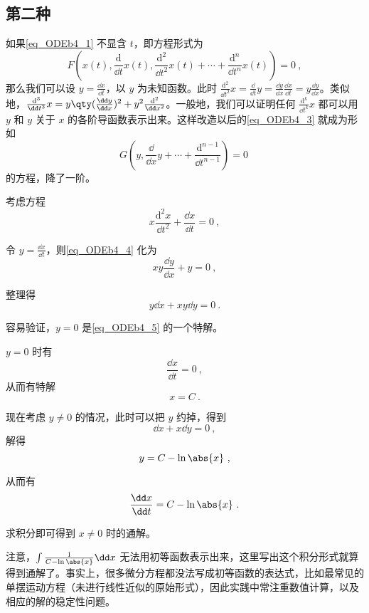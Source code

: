 \subsection{第二种}

如果\autoref{eq_ODEb4_1} 不显含 $t$，即方程形式为
\begin{equation}\label{eq_ODEb4_3}
F(x(t), \frac{\mathrm{d}}{\dd t}x(t), \frac{\mathrm{d}^2}{\dd t^2}x(t)+\cdots+\frac{\mathrm{d}^n}{\dd t^n}x(t))=0~,
\end{equation}
那么我们可以设 $y=\frac{\dd x}{\dd t}$，以 $y$ 为未知函数。此时 $\frac{\mathrm{d}^2}{\dd t^2}x=\frac{\dd}{\dd t}y=\frac{\dd y}{\dd x}\frac{\dd x}{\dd t}=y\frac{\dd y}{\dd x}$。类似地，$\frac{\mathrm{d}^3}{\dd t^3}x=y\qty(\frac{\dd y}{\dd x})^2+y^2\frac{\mathrm{d}^2}{\dd x^2}$。一般地，我们可以证明任何 $\frac{\mathrm{d}^k}{\dd t^k}x$ 都可以用 $y$ 和 $y$ 关于 $x$ 的各阶导函数表示出来。这样改造以后的\autoref{eq_ODEb4_3} 就成为形如
\begin{equation}
G(y, \frac{\dd}{\dd x}y+\cdots+\frac{\mathrm{d}^{n-1}}{\dd t^{n-1}})=0~
\end{equation}
的方程，降了一阶。

\begin{example}{}
考虑方程
\begin{equation}\label{eq_ODEb4_4}
x\frac{\mathrm{d}^2 x}{\dd t^2}+\frac{\dd x}{\dd t}=0~,
\end{equation}

令 $y=\frac{\dd x}{\dd t}$，则\autoref{eq_ODEb4_4} 化为
\begin{equation}\label{eq_ODEb4_5}
xy\frac{\dd y}{\dd x}+y=0~,
\end{equation}

整理得
\begin{equation}
y\dd x+xy\dd y=0~.
\end{equation}

容易验证，$y=0$ 是\autoref{eq_ODEb4_5} 的一个特解。

$y=0$ 时有
\begin{equation}
\frac{\dd x}{\dd t}=0~,
\end{equation}
从而有特解
\begin{equation}
x=C~.
\end{equation}

现在考虑 $y\neq 0$ 的情况，此时可以把 $y$ 约掉，得到
\begin{equation}\label{eq_ODEb4_6}
\dd x+x\dd y=0~,
\end{equation}
解得
\begin{equation}
y=C-\ln\abs{x}~,
\end{equation}

从而有
\begin{equation}
\frac{\dd x}{\dd t}=C-\ln\abs{x}~.
\end{equation}

求积分即可得到 $x\neq 0$ 时的通解。

注意，$\int\frac{1}{C-\ln\abs{x}}\dd x$ 无法用初等函数表示出来，这里写出这个积分形式就算得到通解了。事实上，很多微分方程都没法写成初等函数的表达式，比如最常见的单摆运动方程（未进行线性近似的原始形式），因此实践中常注重数值计算，以及相应的解的稳定性问题。

\end{example}


